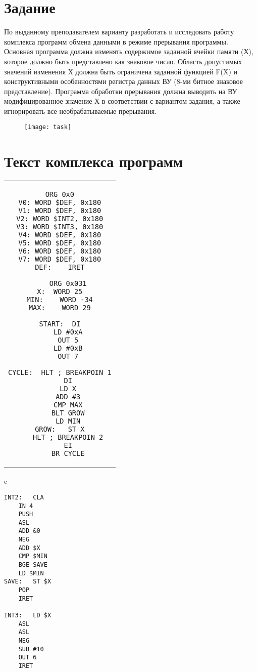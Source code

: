 \tableofcontents

\newpage

\section{Задание}
По выданному преподавателем варианту разработать и исследовать работу комплекса программ обмена данными в режиме прерывания программы. Основная программа должна изменять содержимое заданной ячейки памяти (Х), которое должно быть представлено как знаковое число. Область допустимых значений изменения Х должна быть ограничена заданной функцией F(X) и конструктивными особенностями регистра данных ВУ (8-ми битное знаковое представление). Программа обработки прерывания должна выводить на ВУ модифицированное значение Х в соответствии с вариантом задания, а также игнорировать все необрабатываемые прерывания.
\begin{figure}[H]
\centering
\texttt{[image: task]}
\label{pic:task}
\end{figure}

\section{Текст комплекса программ}
\begin{center}
\begin{tabular}{c}
\begin{lstlisting}[basicstyle=\ttfamily]
	ORG 0x0
V0:	WORD $DEF, 0x180
V1:	WORD $DEF, 0x180
V2:	WORD $INT2, 0x180
V3:	WORD $INT3, 0x180
V4:	WORD $DEF, 0x180
V5:	WORD $DEF, 0x180
V6:	WORD $DEF, 0x180
V7:	WORD $DEF, 0x180
DEF:	IRET

	ORG 0x031
X:	WORD 25
MIN:	WORD -34
MAX:	WORD 29

START:	DI
	LD #0xA
	OUT 5
	LD #0xB
	OUT 7

CYCLE:	HLT	; BREAKPOIN 1
	DI
	LD X
	ADD #3
	CMP MAX
	BLT GROW
	LD MIN
GROW:	ST X
	HLT	; BREAKPOIN 2
	EI
	BR CYCLE
\end{lstlisting}
\end{tabular}
\end{center}

\begin{center}
\begin{tabular}{c}
\begin{lstlisting}[basicstyle=\ttfamily]
INT2:	CLA
	IN 4
	PUSH
	ASL
	ADD &0
	NEG
	ADD $X
	CMP $MIN
	BGE SAVE
	LD $MIN
SAVE:	ST $X
	POP
	IRET

INT3:	LD $X
	ASL
	ASL
	NEG
	SUB #10
	OUT 6
	IRET
\end{lstlisting}
\end{tabular}
\end{center}

